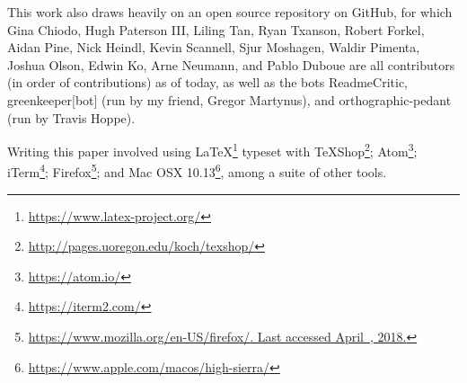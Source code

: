 \documentclass[12pt,a4paper]{article}
\begin{document}
\noindent This work also draws heavily on an open source repository on GitHub, for which Gina Chiodo, Hugh Paterson III, Liling Tan, Ryan Txanson, Robert Forkel, Aidan Pine, Nick Heindl, Kevin Scannell, Sjur Moshagen, Waldir Pimenta, Joshua Olson, Edwin Ko, Arne Neumann, and Pablo Duboue are all contributors (in order of contributions) as of today, as well as the bots ReadmeCritic, greenkeeper[bot] (run by my friend, Gregor Martynus), and orthographic-pedant (run by Travis Hoppe).

Writing this paper involved using LaTeX\footnote{\href{https://www.latex-project.org/}{https://www.latex-project.org/}} typeset with TeXShop\footnote{\href{http://pages.uoregon.edu/koch/texshop/}{http://pages.uoregon.edu/koch/texshop/}}; Atom\footnote{\href{https://atom.io/}{https://atom.io/}}; iTerm\footnote{\href{https://iterm2.com/}{https://iterm2.com/}}; Firefox\footnote{\href{https://www.mozilla.org/en-US/firefox/}{https://www.mozilla.org/en-US/firefox/. Last accessed April~, 2018.}}; and Mac OSX 10.13\footnote{\href{https://www.apple.com/macos/high-sierra/}{https://www.apple.com/macos/high-sierra/}}, among a suite of other tools.

\newpage

%
\tableofcontents
\thispagestyle{empty}

\newpage
\thispagestyle{empty}
\listoffigures
\listoftables
\thispagestyle{empty}
\newpage

\setcounter{page}{1}

\end{document}

